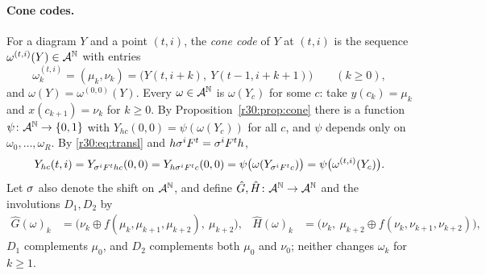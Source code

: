 \paragraph{Cone codes.} For a diagram $Y$ and a point $(t,i)$, the \emph{cone code} of $Y$ at $(t,i)$ is the sequence $\omega^{(t,i)}(Y)\in\mathcal{A}^{\mathbb{N}}$ with entries
\[
\omega^{(t,i)}_k=(\mu_k,\nu_k)=\bigl(Y(t,i+k),\ Y(t-1,i+k+1)\bigr)\qquad(k\ge0),
\]
and $\omega(Y)=\omega^{(0,0)}(Y)$. Every $\omega\in\mathcal{A}^{\mathbb{N}}$ is $\omega(Y_c)$ for some $c$: take $y(c_k)=\mu_k$ and $x(c_{k+1})=\nu_k$ for $k\ge0$. By Proposition~\ref{r30:prop:cone} there is a function $\psi\colon\mathcal{A}^{\mathbb{N}}\to\{0,1\}$ with $Y_{hc}(0,0)=\psi(\omega(Y_c))$ for all $c$, and $\psi$ depends only on $\omega_0,\dots,\omega_R$. By \eqref{r30:eq:transl} and $h\sigma^iF^t=\sigma^iF^th$,
\begin{equation}\label{r30:eq:psi}
Y_{hc}(t,i)=Y_{\sigma^iF^thc}(0,0)=Y_{h\sigma^iF^tc}(0,0)=\psi\bigl(\omega(Y_{\sigma^iF^tc})\bigr)=\psi\bigl(\omega^{(t,i)}(Y_c)\bigr).
\end{equation}
Let $\sigma$ also denote the shift on $\mathcal{A}^{\mathbb{N}}$, and define $\hat G,\hat H\colon\mathcal{A}^{\mathbb{N}}\to\mathcal{A}^{\mathbb{N}}$ and the involutions $D_1,D_2$ by
\begin{align*}
\hat G(\omega)_k&=\bigl(\nu_k\oplus f(\mu_k,\mu_{k+1},\mu_{k+2}),\ \mu_{k+2}\bigr),&
\hat H(\omega)_k&=\bigl(\nu_k,\ \mu_{k+2}\oplus f(\nu_k,\nu_{k+1},\nu_{k+2})\bigr),
\end{align*}
$D_1$ complements $\mu_0$, and $D_2$ complements both $\mu_0$ and $\nu_0$; neither changes $\omega_k$ for $k\ge1$.

